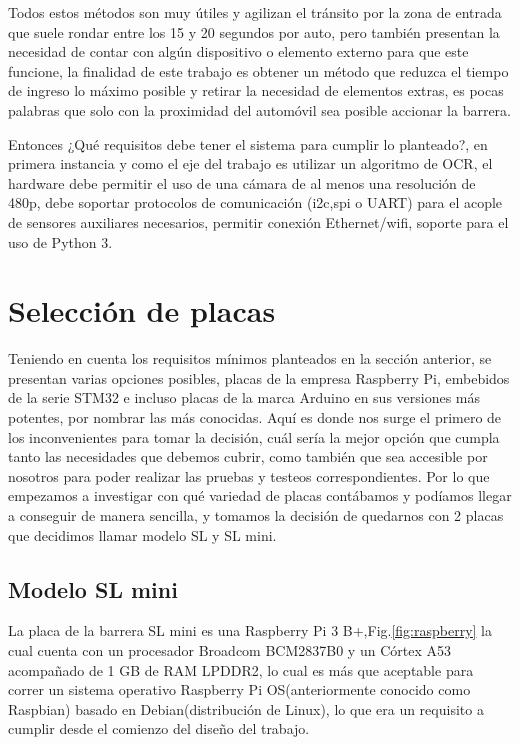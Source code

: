 Todos estos métodos son muy útiles y agilizan el tránsito por la zona de entrada que suele rondar entre los 15 y 20 segundos por
auto, pero también presentan la necesidad de contar con algún dispositivo o elemento externo para que este funcione, la finalidad
de este trabajo es obtener un método que reduzca el tiempo de ingreso lo máximo posible y retirar la necesidad de elementos
extras, es pocas palabras que solo con la proximidad del automóvil sea posible accionar la barrera.


Entonces ¿Qué requisitos debe tener el sistema para cumplir lo planteado?, en primera instancia y como el eje del trabajo
es utilizar un algoritmo de OCR, el hardware debe permitir el uso de una cámara de al menos una resolución de 480p, debe
soportar protocolos de comunicación (i2c,spi o UART) para el acople de sensores auxiliares necesarios, permitir conexión
Ethernet/wifi, soporte para el uso de Python 3.

\section{Selección de placas}
Teniendo en cuenta los requisitos mínimos planteados en la sección anterior, se presentan varias opciones posibles,
placas de la empresa Raspberry Pi, embebidos de la serie STM32 e incluso placas de la marca Arduino en sus versiones más
potentes, por nombrar las más conocidas. Aquí es donde nos surge el primero de los inconvenientes para tomar la decisión,
cuál sería la mejor opción que cumpla tanto las necesidades que debemos cubrir, como también que sea accesible por nosotros
para poder realizar las pruebas y testeos correspondientes.
Por lo que empezamos a investigar con qué variedad de placas contábamos y podíamos llegar a conseguir de manera sencilla,
y tomamos la decisión de quedarnos con 2 placas que decidimos llamar modelo SL y SL mini.

\subsection{Modelo SL mini}
La placa de la barrera SL mini es una Raspberry Pi 3 B+,Fig.\ref{fig:raspberry} la cual cuenta con un procesador
Broadcom BCM2837B0 y un Córtex A53 acompañado de 1 GB de RAM LPDDR2, lo cual es más que aceptable para correr un sistema operativo Raspberry Pi
OS(anteriormente conocido como Raspbian) basado en Debian(distribución de Linux), lo que era un requisito a cumplir desde
el comienzo del diseño del trabajo.


